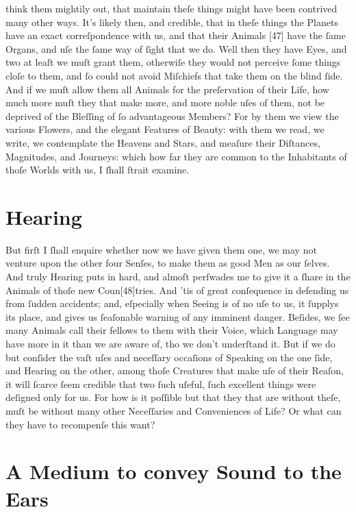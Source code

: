 \documentclass[letterpaper]{book}
\begin{document}
think them mightily out, that maintain theſe things might have been
contrived many other ways.  It's likely then, and credible, that in theſe
things the Planets have an exact correſpondence with us, and that their
Animals [47] have the ſame Organs, and uſe the ſame way of ſight that we do.
Well then they have Eyes, and two at leaſt we muſt grant them, otherwiſe
they would not perceive ſome things cloſe to them, and ſo could not avoid
Miſchiefs that take them on the blind ſide. And if we muſt allow them all
Animals for the preſervation of their Life, how much more muſt they that
make more, and more noble uſes of them, not be deprived of the Bleſſing of
ſo advantageous Members? For by them we view the various Flowers, and the
elegant Features of Beauty: with them we read, we write, we contemplate the
Heavens and Stars, and meaſure their Diſtances, Magnitudes, and Journeys:
which how far they are common to the Inhabitants of thoſe Worlds with us, I
ſhall ſtrait examine.


\section{Hearing}

But firſt I ſhall enquire whether now we have given them one, we may not
venture upon the other four Senſes, to make them as good Men as our ſelves.
And truly Hearing puts in hard, and almoſt perſwades me to give it a ſhare
in the Animals of thoſe new Coun[48]tries. And 'tis of great conſequence in
defending us from ſudden accidents; and, eſpecially when Seeing is of no uſe
to us, it ſupplys its place, and gives us ſeaſonable warning of any imminent
danger. Beſides, we ſee many Animals call their fellows to them with their
Voice, which Language may have more in it than we are aware of, tho we
don't underſtand it. But if we do but conſider the vaſt uſes and neceſſary
occaſions of Speaking on the one ſide, and Hearing on the other, among
thoſe Creatures that make uſe of their Reaſon, it will ſcarce ſeem credible
that two ſuch uſeful, ſuch excellent things were deſigned only for us. For
how is it poſſible but that they that are without theſe, muſt be without
many other Neceſſaries and Conveniences of Life? Or what can they have
to recompenſe this want?


\section{A Medium to convey Sound to the Ears}
\end{document}
